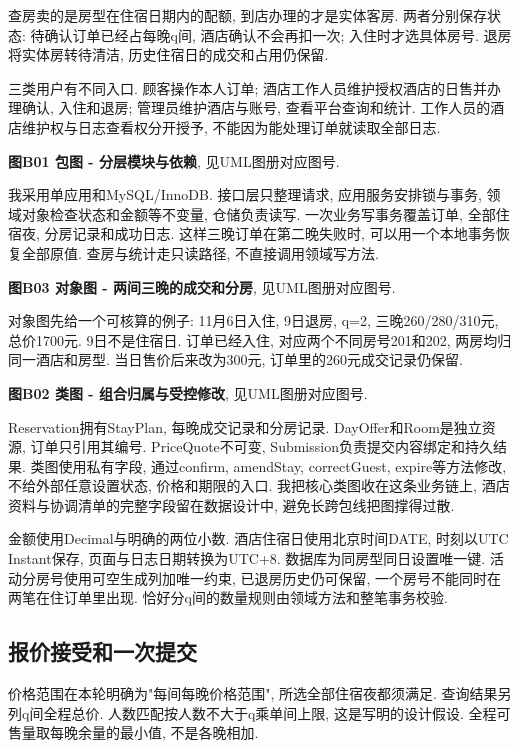 \documentclass[cn,nofont,11pt,a4paper]{elegantpaper}
\begin{document}
查房卖的是房型在住宿日期内的配额, 到店办理的才是实体客房. 两者分别保存状态: 待确认订单已经占每晚q间, 酒店确认不会再扣一次; 入住时才选具体房号. 退房将实体房转待清洁, 历史住宿日的成交和占用仍保留.

三类用户有不同入口. 顾客操作本人订单; 酒店工作人员维护授权酒店的日售并办理确认, 入住和退房; 管理员维护酒店与账号, 查看平台查询和统计. 工作人员的酒店维护权与日志查看权分开授予, 不能因为能处理订单就读取全部日志.

\textbf{图B01 包图 - 分层模块与依赖}, 见UML图册对应图号.

我采用单应用和MySQL/InnoDB. 接口层只整理请求, 应用服务安排锁与事务, 领域对象检查状态和金额等不变量, 仓储负责读写. 一次业务写事务覆盖订单, 全部住宿夜, 分房记录和成功日志. 这样三晚订单在第二晚失败时, 可以用一个本地事务恢复全部原值. 查房与统计走只读路径, 不直接调用领域写方法.

\textbf{图B03 对象图 - 两间三晚的成交和分房}, 见UML图册对应图号.

对象图先给一个可核算的例子: 11月6日入住, 9日退房, q=2, 三晚260/280/310元, 总价1700元. 9日不是住宿日. 订单已经入住, 对应两个不同房号201和202, 两房均归同一酒店和房型. 当日售价后来改为300元, 订单里的260元成交记录仍保留.

\textbf{图B02 类图 - 组合归属与受控修改}, 见UML图册对应图号.

Reservation拥有StayPlan, 每晚成交记录和分房记录. DayOffer和Room是独立资源, 订单只引用其编号. PriceQuote不可变, Submission负责提交内容绑定和持久结果. 类图使用私有字段, 通过confirm, amendStay, correctGuest, expire等方法修改, 不给外部任意设置状态, 价格和期限的入口. 我把核心类图收在这条业务链上, 酒店资料与协调清单的完整字段留在数据设计中, 避免长跨包线把图撑得过散.

金额使用Decimal与明确的两位小数. 酒店住宿日使用北京时间DATE, 时刻以UTC Instant保存, 页面与日志日期转换为UTC+8. 数据库为同房型同日设置唯一键. 活动分房号使用可空生成列加唯一约束, 已退房历史仍可保留, 一个房号不能同时在两笔在住订单里出现. 恰好分q间的数量规则由领域方法和整笔事务校验.

\hypertarget{ux62a5ux4ef7ux63a5ux53d7ux548cux4e00ux6b21ux63d0ux4ea4}{%
\subsection{报价接受和一次提交}\label{ux62a5ux4ef7ux63a5ux53d7ux548cux4e00ux6b21ux63d0ux4ea4}}

价格范围在本轮明确为"每间每晚价格范围", 所选全部住宿夜都须满足. 查询结果另列q间全程总价. 人数匹配按人数不大于q乘单间上限, 这是写明的设计假设. 全程可售量取每晚余量的最小值, 不是各晚相加.
\end{document}
